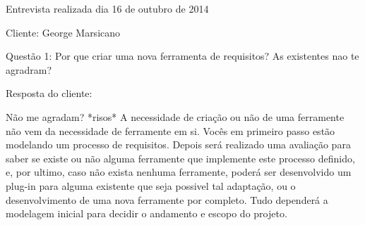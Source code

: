 Entrevista realizada dia 16 de outubro de 2014

Cliente: George Marsicano

Questão 1: Por que criar uma nova ferramenta de requisitos? As existentes nao te agradram?

Resposta do cliente:

	Não me agradam? *risos*
	A necessidade de criação ou não de uma ferramente não vem da necessidade de ferramente em si.
	Vocês em primeiro passo estão modelando um processo de requisitos. Depois será realizado uma avaliação para saber se existe ou não alguma ferramente que implemente este processo definido, e, por ultimo, caso não exista nenhuma ferramente, poderá ser desenvolvido um plug-in para alguma existente que seja possivel tal adaptação, ou o desenvolvimento de uma nova ferramente por completo.
Tudo dependerá a modelagem inicial para decidir o andamento e escopo do projeto.